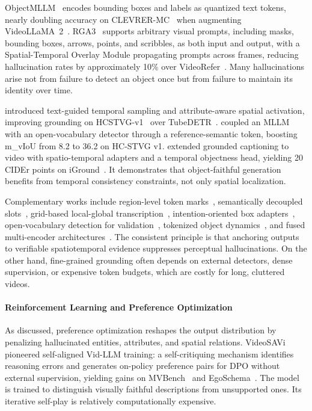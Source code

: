 \documentclass[10pt]{article} %
\begin{document}
ObjectMLLM~\citep{Tang2025HowCO} encodes bounding boxes and labels as quantized text tokens, nearly doubling accuracy on CLEVRER-MC~\citep{yi2019clevrer} when augmenting VideoLLaMA~2~\citep{Cheng2024VideoLLaMA2A}. RGA3~\citep{Wang2025ObjectcentricVQ} supports arbitrary visual prompts, including masks, bounding boxes, arrows, points, and scribbles, as both input and output, with a Spatial-Temporal Overlay Module propagating prompts across frames, reducing hallucination rates by approximately 10\% over VideoRefer~\citep{Yuan2024VideoReferSA}. Many hallucinations arise not from failure to detect an object once but from failure to maintain its identity over time.

\citet{Gu2025KnowingYT} introduced text-guided temporal sampling and attribute-aware spatial activation, improving grounding on HCSTVG-v1~\citep{tang2021human} over TubeDETR~\citep{Wasim2023VideoGroundingDINOTO}. \citet{Gao202511} coupled an MLLM with an open-vocabulary detector through a reference-semantic token, boosting m\_vIoU from 8.2 to 36.2 on HC-STVG v1. \citet{Kazakos2025LargescalePF} extended grounded captioning to video with spatio-temporal adapters and a temporal objectness head, yielding 20 CIDEr points on iGround~\citep{kazakos2025large}. It demonstrates that object-faithful generation benefits from temporal consistency constraints, not only spatial localization.

Complementary works include region-level token marks~\citep{Heo2025OmniRGPTUI}, semantically decoupled slots~\citep{Xu2024SlotVLMSS}, grid-based local-global transcription~\citep{Chowdhury2025GridLOGATGB}, intention-oriented box adapters~\citep{Qiu2025IntentVCNetBS}, open-vocabulary detection for validation~\citep{Montes2025ViQAgentZV}, tokenized object dynamics~\citep{Feng2024VideoOrionTO}, and fused multi-encoder architectures~\citep{Chung2025UnifyingSV}. The consistent principle is that anchoring outputs to verifiable spatiotemporal evidence suppresses perceptual hallucinations. On the other hand, fine-grained grounding often depends on external detectors, dense supervision, or expensive token budgets, which are costly for long, cluttered videos.

\paragraph{Reinforcement Learning and Preference Optimization}

As discussed, preference optimization reshapes the output distribution by penalizing hallucinated entities, attributes, and spatial relations. VideoSAVi~\citep{Kulkarni2024VideoSAViSV} pioneered self-aligned Vid-LLM training: a self-critiquing mechanism identifies reasoning errors and generates on-policy preference pairs for DPO without external supervision, yielding gains on MVBench~\citep{li2024mvbench} and EgoSchema~\citep{mangalam2023egoschema}. The model is trained to distinguish visually faithful descriptions from unsupported ones. Its iterative self-play is relatively computationally expensive.
\end{document}
